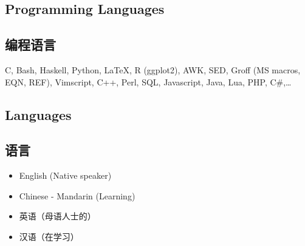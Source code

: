 \begin{xen}
\section{Programming Languages}
\end{xen}
\begin{xcn}
\section{编程语言}
\end{xcn}
    C,
    Bash,
    Haskell,
    Python,
    \LaTeX,
    R (ggplot2),
    AWK,
    SED,
    Groff (MS macros, EQN, REF),
    Vimscript,
    C++,
    Perl,
    SQL,
    Javascript,
    Java,
    Lua,
    PHP,
    C\#,\ldots
\begin{xen}
\section{Languages}
\end{xen}
\begin{xcn}
\section{语言}
\end{xcn}
\begin{xen}
    \begin{itemize}
        \item English (Native speaker)
        \item Chinese - Mandarin (Learning)
    \end{itemize}
\end{xen}
\begin{xcn}
    \begin{itemize}
        \item 英语（母语人士的）
        \item 汉语（在学习）
    \end{itemize}
\end{xcn}
